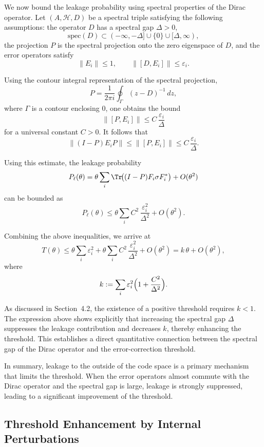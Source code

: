 \documentclass[12pt]{article}
\theoremstyle{definition} %
\theoremstyle{plain} %
\theoremstyle{remark} %
\theoremstyle{underline}
\begin{document}
We now bound the leakage probability using spectral properties of the Dirac operator.
Let $(A,\mathcal H,D)$ be a spectral triple satisfying the following assumptions: the operator $D$ has a spectral gap $\Delta>0$,
\[
    \mathrm{spec}(D)\subset (-\infty,-\Delta]\cup\{0\}\cup[\Delta,\infty),
\]
the projection $P$ is the spectral projection onto the zero eigenspace of $D$, and the error operators satisfy
\[
    \|E_i\|\le 1,
    \qquad
    \|[D,E_i]\|\le \varepsilon_i.
\]

Using the contour integral representation of the spectral projection,
\[
    P=\frac{1}{2\pi i}\oint_\Gamma (z-D)^{-1}\,dz,
\]
where $\Gamma$ is a contour enclosing $0$, one obtains the bound
\[
    \|[P,E_i]\|\le C\,\frac{\varepsilon_i}{\Delta}
\]
for a universal constant $C>0$.
It follows that
\[
    \|(I-P)E_iP\|
    \le
    \|[P,E_i]\|
    \le
    C\,\frac{\varepsilon_i}{\Delta}.
\]

Using this estimate, the leakage probability
\[
    P_\ell(\theta)
    =
    \theta\sum_i \Tr\!\bigl((I-P)F_i\sigma F_i^*\bigr)
    +
    O(\theta^2)
\]
can be bounded as
\[
    P_\ell(\theta)
    \le
    \theta\sum_i C^2\,\frac{\varepsilon_i^2}{\Delta^2}
    +
    O(\theta^2).
\]

Combining the above inequalities, we arrive at
\[
    T(\theta)
    \le
    \theta\sum_i \varepsilon_i^2
    +
    \theta\sum_i C^2\,\frac{\varepsilon_i^2}{\Delta^2}
    +
    O(\theta^2)
    =
    k\,\theta
    +
    O(\theta^2),
\]
where
\[
    k:=\sum_i \varepsilon_i^2\Bigl(1+\frac{C^2}{\Delta^2}\Bigr).
\]

As discussed in Section~4.2, the existence of a positive threshold requires $k<1$.
The expression above shows explicitly that increasing the spectral gap $\Delta$ suppresses the leakage contribution and decreases $k$, thereby enhancing the threshold.
This establishes a direct quantitative connection between the spectral gap of the Dirac operator and the error-correction threshold.

In summary, leakage to the outside of the code space is a primary mechanism that limits the threshold.
When the error operators almost commute with the Dirac operator and the spectral gap is large, leakage is strongly suppressed, leading to a significant improvement of the threshold.



\subsection{Threshold Enhancement by Internal Perturbations}
\end{document}
